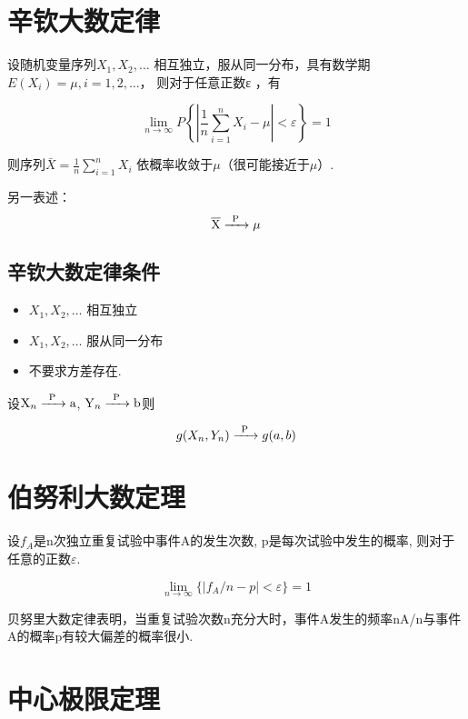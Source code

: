 \section{辛钦大数定律}

\begin{theorem}[辛钦大数定律]
    设随机变量序列$X_1,X_2, …$   相互独立，服从同一分布，具有数学期$E(X_i)=\mu, i=1,2,…$， 则对于任意正数ε ，有

$$\lim _{n \rightarrow \infty} P\left\{\left|\frac{1}{n} \sum_{i=1}^{n} X_{i}-\mu\right|<\varepsilon\right\}=1$$

则序列$\bar{X}=\frac{1}{n} \sum_{i=1}^{n} X_{i}$ 依概率收敛于$\mu$（很可能接近于$\mu$）.
\end{theorem}

另一表述：
$$\ce{\overline{X} ->[P] \mu}$$

\subsection{辛钦大数定律条件}

\begin{itemize}
    \item $X_1,X_2, …$ 相互独立
    \item $X_1,X_2, …$ 服从同一分布
    \item 不要求方差存在. 
\end{itemize}

\begin{corollary}
设$\ce{X_n ->[P] a}$, $\ce{Y_n ->[P] b}$则

$$
   g(X_n, Y_n)\ce{->[P]} g(a,b)
$$
\end{corollary}

\section{伯努利大数定理}

\begin{theorem}[伯努利大数定理]
设$f_A$是n次独立重复试验中事件A的发生次数, p是每次试验中发生的概率, 则对于任意的正数$\varepsilon$.

$$
 \lim_{n \to \infty}\{ |f_A/n - p| < \varepsilon\} = 1  
$$
\end{theorem}

贝努里大数定律表明，当重复试验次数n充分大时，事件A发生的频率nA/n与事件A的概率p有较大偏差的概率很小.

\section{中心极限定理}

